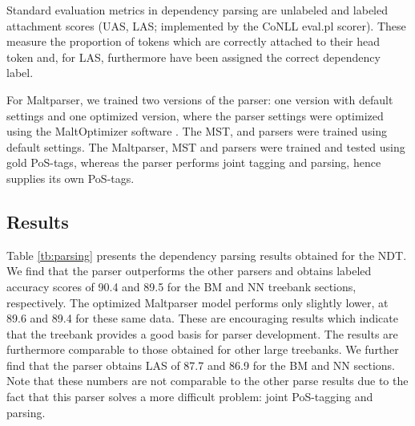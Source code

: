 \documentclass[10pt,a4paper]{article}
\begin{document}
Standard evaluation metrics in dependency parsing are unlabeled and
labeled attachment scores (UAS, LAS; implemented by the CoNLL
\textsf{eval.pl} scorer). These measure the proportion of tokens
which are correctly attached to their head token and, for LAS,
furthermore have been assigned the correct dependency label.

For Maltparser, we trained two versions of the
parser: one version with default settings and one optimized version,
where the parser settings were optimized using the MaltOptimizer
software \cite{Bal:Niv:12}. The MST,  and  
parsers were trained using default settings.
The Maltparser, MST and  parsers were trained and tested using gold PoS-tags, whereas the  parser performs joint tagging and parsing, hence supplies its own PoS-tags.


\subsection{Results}
Table \ref{tb:parsing} presents the dependency parsing results
obtained for the NDT. We find that the  parser
outperforms the other parsers and obtains labeled accuracy scores of
90.4 and 89.5 for the BM and NN treebank sections, respectively.  The
optimized Maltparser model performs only slightly lower, at 89.6 and
89.4 for these same data.  These are encouraging results which
indicate that the treebank provides a good basis for parser
development. The results are furthermore comparable to those obtained for other large treebanks. We further find that the  parser obtains
LAS of 87.7 and 86.9 for the BM and NN sections. Note that these
numbers are not comparable to the other parse results due to the fact
that this parser solves a more difficult problem: joint PoS-tagging
and parsing.
\end{document}
